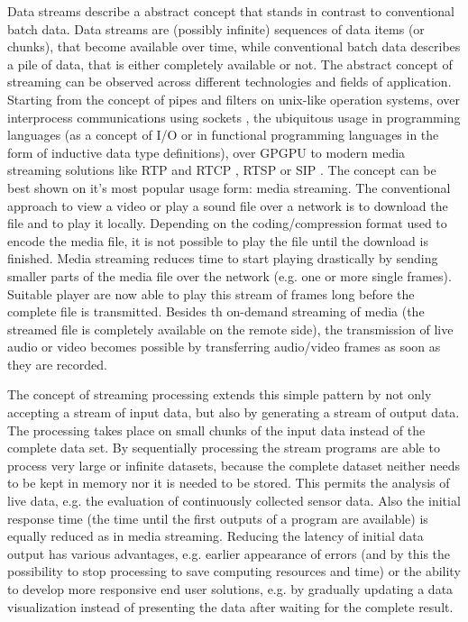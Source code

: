 	Data streams describe a abstract concept that stands in contrast to conventional batch data. Data streams are (possibly infinite) sequences of data items (or chunks), that become available over time, while conventional batch data describes a pile of data, that is either completely available or not. The abstract concept of streaming can be observed across different technologies and fields of application. Starting from the concept of pipes and filters on unix-like operation systems, over interprocess communications using sockets \citep[either local or over a network,][]{buschmann1996pattern}, the ubiquitous usage in programming languages (as a concept of I/O or in functional programming languages in the form of inductive data type definitions), over \ac{GPGPU} to modern media streaming solutions like RTP and RTCP \citep{ietf:rfc3550}, RTSP \citep{ietf:rfc2326} or SIP \citep{ietf:rfc3261}.
	The concept can be best shown on it's most popular usage form: media streaming. The conventional approach to view a video or play a sound file over a network is to download the file and to play it locally. Depending on the coding/compression format used to encode the media file, it is not possible to play the file until the download is finished. Media streaming reduces time to start playing drastically by sending smaller parts of the media file over the network (e.g. one or more single frames). Suitable player are now able to play this stream of frames long before the complete file is transmitted. Besides th on-demand streaming of media (the streamed file is completely available on the remote side), the transmission of live audio or video becomes possible by transferring audio/video frames as soon as they are recorded.

	The concept of streaming processing extends this simple pattern by not only accepting a stream of input data, but also by generating a stream of output data. The processing takes place on small chunks of the input data instead of the complete data set. By sequentially processing the stream programs are able to process very large or infinite datasets, because the complete dataset neither needs to be kept in memory nor it is needed to be stored. This permits the analysis of live data, e.g. the evaluation of continuously collected sensor data. Also the initial response time (the time until the first outputs of a program are available) is equally reduced as in media streaming. Reducing the latency of initial data output has various advantages, e.g. earlier appearance of errors (and by this the possibility to stop processing to save computing resources and time) or the ability to develop more responsive end user solutions, e.g. by gradually updating a data visualization instead of presenting the data after waiting for the complete result.

